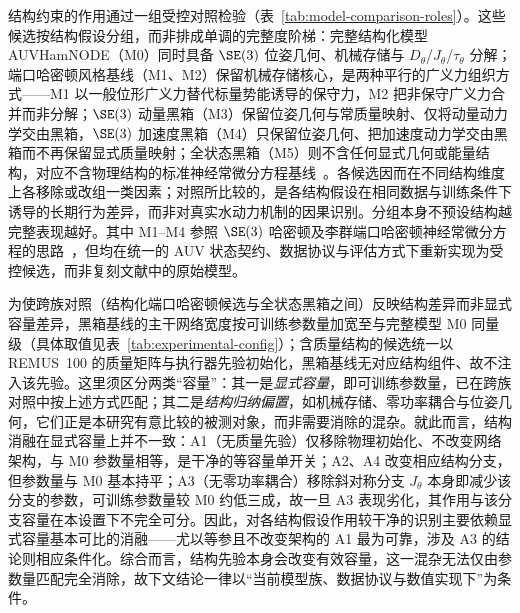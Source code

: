 结构约束的作用通过一组受控对照检验（表~\ref{tab:model-comparison-roles}）。这些候选按结构假设分组，而非排成单调的完整度阶梯：完整结构化模型 AUVHamNODE（M0）同时具备 \(\SE(3)\) 位姿几何、机械存储与 \(D_\theta\)/\(J_\theta\)/\(\tau_\theta\) 分解；端口哈密顿风格基线（M1、M2）保留机械存储核心，是两种平行的广义力组织方式——M1 以一般位形广义力替代标量势能诱导的保守力，M2 把非保守广义力合并而非分解；\(\SE(3)\) 动量黑箱（M3）保留位姿几何与常质量映射、仅将动量动力学交由黑箱，\(\SE(3)\) 加速度黑箱（M4）只保留位姿几何、把加速度动力学交由黑箱而不再保留显式质量映射；全状态黑箱（M5）则不含任何显式几何或能量结构，对应不含物理结构的标准神经常微分方程基线~\citep{chen2018neuralode}。各候选因而在不同结构维度上各移除或改组一类因素；对照所比较的，是各结构假设在相同数据与训练条件下诱导的长期行为差异，而非对真实水动力机制的因果识别。分组本身不预设结构越完整表现越好。其中 M1--M4 参照 \(\SE(3)\) 哈密顿及李群端口哈密顿神经常微分方程的思路~\citep{duong2021se3hamnode,duong2024liegroupphnode}，但均在统一的 AUV 状态契约、数据协议与评估方式下重新实现为受控候选，而非复刻文献中的原始模型。

为使跨族对照（结构化端口哈密顿候选与全状态黑箱之间）反映结构差异而非显式容量差异，黑箱基线的主干网络宽度按可训练参数量加宽至与完整模型 M0 同量级（具体取值见表~\ref{tab:experimental-config}）；含质量结构的候选统一以 REMUS~100 的质量矩阵与执行器先验初始化，黑箱基线无对应结构组件、故不注入该先验。这里须区分两类“容量”：其一是\emph{显式容量}，即可训练参数量，已在跨族对照中按上述方式匹配；其二是\emph{结构归纳偏置}，如机械存储、零功率耦合与位姿几何，它们正是本研究有意比较的被测对象，而非需要消除的混杂。就此而言，结构消融在显式容量上并不一致：A1（无质量先验）仅移除物理初始化、不改变网络架构，与 M0 参数量相等，是干净的等容量单开关；A2、A4 改变相应结构分支，但参数量与 M0 基本持平；A3（无零功率耦合）移除斜对称分支 \(J_\theta\) 本身即减少该分支的参数，可训练参数量较 M0 约低三成，故一旦 A3 表现劣化，其作用与该分支容量在本设置下不完全可分。因此，对各结构假设作用较干净的识别主要依赖显式容量基本可比的消融——尤以等参且不改变架构的 A1 最为可靠，涉及 A3 的结论则相应条件化。综合而言，结构先验本身会改变有效容量，这一混杂无法仅由参数量匹配完全消除，故下文结论一律以“当前模型族、数据协议与数值实现下”为条件。

